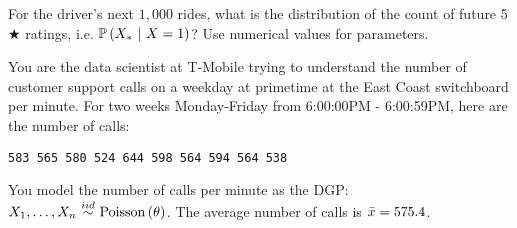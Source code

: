 \documentclass[12pt]{article}
\begin{document}
\begin{enumerate}[(a)]
 For the driver's next $1,000$ rides, what is the distribution of the count of future 5 $\bigstar$ ratings, i.e. $\mathbb{P}\left(X_{*}~|~X = 1\right)$? Use numerical values for parameters.

\vspace{-0.5cm}


\end{enumerate}



\problem You are the data scientist at T-Mobile trying to understand the number of customer support calls on a weekday at primetime at the East Coast switchboard per minute. For two weeks Monday-Friday from 6:00:00PM - 6:00:59PM, here are the number of calls:

\begin{verbatim}
583 565 580 524 644 598 564 594 564 538
\end{verbatim}

\noindent You model the number of calls per minute as the DGP: $\Xoneton \iid \poisson{\theta}$. The average number of calls is $\bar{x} = 575.4$.
\end{document}
